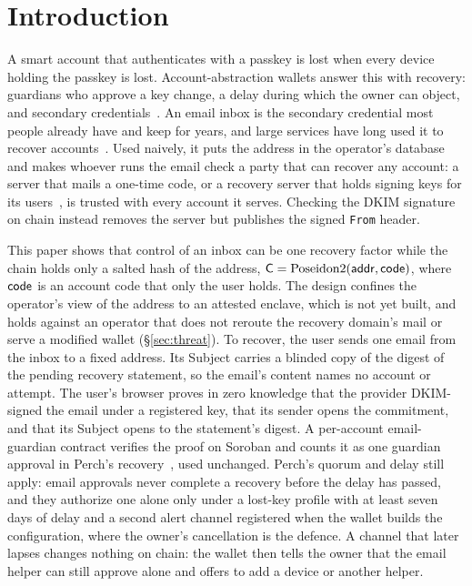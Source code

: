\section{Introduction}\label{sec:intro}

A smart account that authenticates with a passkey is lost when every device
holding the passkey is lost. Account-abstraction wallets answer this with
recovery: guardians who approve a key change, a delay during which the owner
can object, and secondary credentials~\cite{buterin-social-recovery,argent-spec,erc4337}.
An email inbox is the secondary credential most people already have and keep
for years, and large services have long used it to recover
accounts~\cite{bonneau-recovery}. Used naively, it puts the address in the
operator's database and makes whoever runs the email check a party that can
recover any account: a server that mails a one-time code, or a recovery
server that holds signing keys for its users~\cite{sep30}, is trusted with
every account it serves. Checking the DKIM signature~\cite{rfc6376} on chain
instead removes the server but publishes the signed \texttt{From} header.

This paper shows that control of an inbox can be one recovery factor while
the chain holds only a salted hash of the address,
$\mathsf{C} = \mathrm{Poseidon2}(\mathsf{addr}, \mathsf{code})$, where $\mathsf{code}$ is an account code that only the user holds. The
design confines the operator's view of the address to an attested enclave,
which is not yet built, and holds against an operator that does not reroute
the recovery domain's mail or serve a modified wallet (\S\ref{sec:threat}). To
recover, the user sends one email from the inbox to a fixed address. Its
Subject carries a blinded copy of the digest of the pending recovery
statement, so the email's content names no account or attempt. The user's
browser proves in zero knowledge that the provider DKIM-signed the email
under a registered key, that its sender opens the commitment, and that its
Subject opens to the statement's digest. A per-account email-guardian
contract verifies the proof on Soroban and counts it as one guardian
approval in Perch's recovery~\cite{perch-recovery-spec}, used unchanged.
Perch's quorum and delay still apply: email approvals never complete a
recovery before the delay has passed, and they authorize one alone only
under a lost-key profile with at least seven days of delay and a second
alert channel registered when the wallet builds the configuration, where the
owner's cancellation is the defence. A channel that later lapses changes
nothing on chain: the wallet then tells the owner that the email helper can
still approve alone and offers to add a device or another helper.

